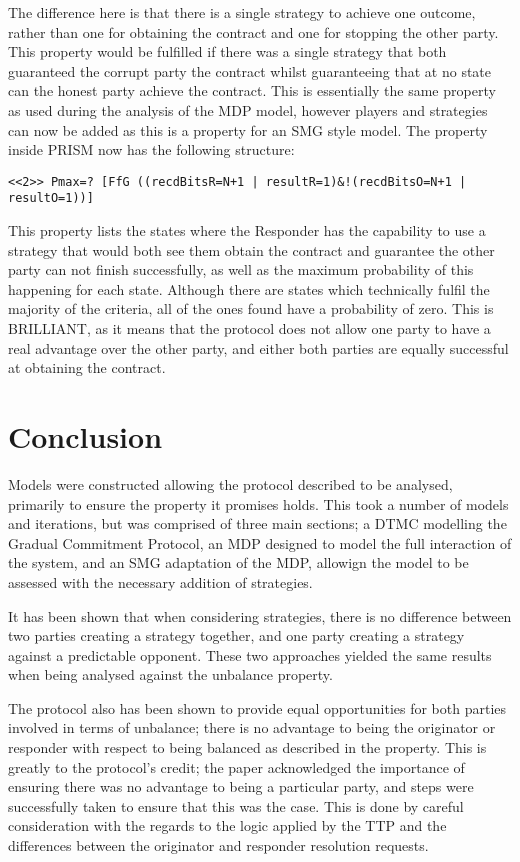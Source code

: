 \documentclass{l4proj}
\begin{document}
The difference here is that there is a single strategy to achieve one outcome, rather than one for obtaining the contract and one for stopping the other party. This property would be fulfilled if there was a single strategy that both guaranteed the corrupt party the contract whilst guaranteeing that at no state can the honest party achieve the contract. This is essentially the same property as used during the analysis of the MDP model, however players and strategies can now be added as this is a property for an SMG style model. The property inside PRISM now has the following structure:
\begin{lstlisting}
<<2>> Pmax=? [FfG ((recdBitsR=N+1 | resultR=1)&!(recdBitsO=N+1 | resultO=1))]
\end{lstlisting}
This property lists the states where the Responder has the capability to use a strategy that would both see them obtain the contract and guarantee the other party can not finish successfully, as well as the maximum probability of this happening for each state. Although there are states which technically fulfil the majority of the criteria, all of the ones found have a probability of zero. This is BRILLIANT, as it means that the protocol does not allow one party to have a real advantage over the other party, and either both parties are equally successful at obtaining the contract. 



\chapter{Conclusion}

Models were constructed allowing the protocol described to be analysed, primarily to ensure the property it promises holds. This took a number of models and iterations, but was comprised of three main sections; a DTMC modelling the Gradual Commitment Protocol, an MDP designed to model the full interaction of the system, and an SMG adaptation of the MDP, allowign the model to be assessed with the necessary addition of strategies.

It has been shown that when considering strategies, there is no difference between two parties creating a strategy together, and one party creating a strategy against a predictable opponent. These two approaches yielded the same results when being analysed against the unbalance property.

The protocol also has been shown to provide equal opportunities for both parties involved in terms of unbalance; there is no advantage to being the originator or responder with respect to being balanced as described in the property. This is greatly to the protocol's credit; the paper acknowledged the importance of ensuring there was no advantage to being a particular party, and steps were successfully taken to ensure that this was the case. This is done by careful consideration with the regards to the logic applied by the TTP and the differences between the originator and responder resolution requests.
\end{document}
